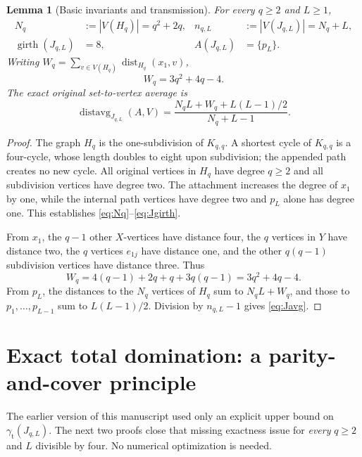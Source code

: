 \documentclass[11pt,a4paper]{article}
\newtheorem{lemma}[theorem]{Lemma}
\theoremstyle{definition}
\theoremstyle{remark}
\newcommand{\dist}{\operatorname{dist}}
\newcommand{\avg}{\operatorname{distavg}}
\newcommand{\girth}{\operatorname{girth}}
\newcommand{\gam}{\gamma_{\mathrm t}}
\begin{document}
\begin{lemma}[Basic invariants and transmission]\label{lem:base}
For every $q\ge2$ and $L\ge1$,
\begin{align}
N_q&:=|V(H_q)|=q^2+2q,& n_{q,L}&:=|V(J_{q,L})|=N_q+L,\label{eq:Nq}\\
\girth(J_{q,L})&=8,&A(J_{q,L})&=\{p_L\}.\label{eq:Jgirth}
\end{align}
Writing $W_q=\sum_{v\in V(H_q)}\dist_{H_q}(x_1,v)$,
\begin{equation}\label{eq:W}
W_q=3q^2+4q-4.
\end{equation}
The \emph{exact} original set-to-vertex average is
\begin{equation}\label{eq:Javg}
\avg_{J_{q,L}}(A,V)=\frac{N_qL+W_q+L(L-1)/2}{N_q+L-1}.
\end{equation}
\end{lemma}
\begin{proof}
The graph $H_q$ is the one-subdivision of $K_{q,q}$. A shortest cycle of $K_{q,q}$ is a four-cycle, whose length doubles to eight upon subdivision; the appended path creates no new cycle. All original vertices in $H_q$ have degree $q\ge2$ and all subdivision vertices have degree two. The attachment increases the degree of $x_1$ by one, while the internal path vertices have degree two and $p_L$ alone has degree one. This establishes \eqref{eq:Nq}--\eqref{eq:Jgirth}.

From $x_1$, the $q-1$ other $X$-vertices have distance four, the $q$ vertices in $Y$ have distance two, the $q$ vertices $e_{1j}$ have distance one, and the other $q(q-1)$ subdivision vertices have distance three. Thus
\[
W_q=4(q-1)+2q+q+3q(q-1)=3q^2+4q-4.
\]
From $p_L$, the distances to the $N_q$ vertices of $H_q$ sum to $N_qL+W_q$, and those to $p_1,\ldots,p_{L-1}$ sum to $L(L-1)/2$. Division by $n_{q,L}-1$ gives \eqref{eq:Javg}.
\end{proof}

\section{Exact total domination: a parity-and-cover principle}
The earlier version of this manuscript used only an explicit upper bound on $\gam(J_{q,L})$. The next two proofs close that missing exactness issue for \emph{every} $q\ge2$ and $L$ divisible by four. No numerical optimization is needed.
\end{document}

